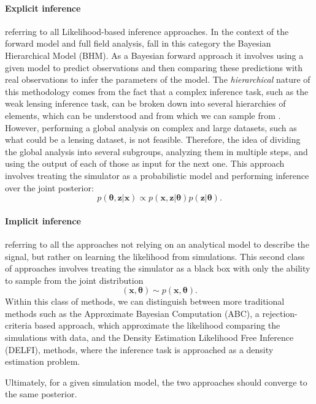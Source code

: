 \documentclass{aa}
\begin{document}
\paragraph{\textbf{Explicit inference}} referring to all Likelihood-based inference approaches. 
In the context of the forward model and full field analysis, fall in this category the Bayesian Hierarchical Model (BHM).
As a Bayesian forward approach it involves using a given model to predict observations and then comparing these predictions with real observations to infer the parameters of the model. The \textit{hierarchical} nature of this methodology comes from the fact that a complex inference task, such as the weak lensing inference task, can be broken down into several hierarchies of elements, which can be understood and from which we can sample from \citep{heavens2018bayesian}. However, performing a global analysis on complex and large datasets, such as what could be a lensing dataset, is not feasible. Therefore, the idea of dividing the global analysis into several subgroups, analyzing them in multiple steps, and using the output of each of those as input for the next one.  
This approach involves treating the simulator as a probabilistic model and performing inference over the joint posterior:
\begin{equation}
        p(\bm{\theta},\bm{z}|\bm{x})\propto  p(\bm{x},\bm{z}|\bm{\theta}) p(\bm{z}|\bm{\theta}).
\end{equation}
\paragraph{\textbf{Implicit inference}} referring to all the approaches not relying on an analytical model to describe the signal, but rather on learning the likelihood from simulations. This second class of approaches involves treating the simulator as a black box with only the ability to sample from the joint distribution
\begin{equation}
    (\bm{x}, \bm{\theta})\sim p(\bm{x}, \bm{\theta}).
\end{equation}
Within this class of methods, we can distinguish between more traditional methods such as the Approximate Bayesian Computation (ABC), a rejection-criteria based approach, which approximate the likelihood comparing the simulations with data, and the Density Estimation Likelihood Free Inference (DELFI), methods, where the inference task is approached as a density estimation problem.


Ultimately, for a given simulation model, the two approaches should converge to the same posterior.
\end{document}
